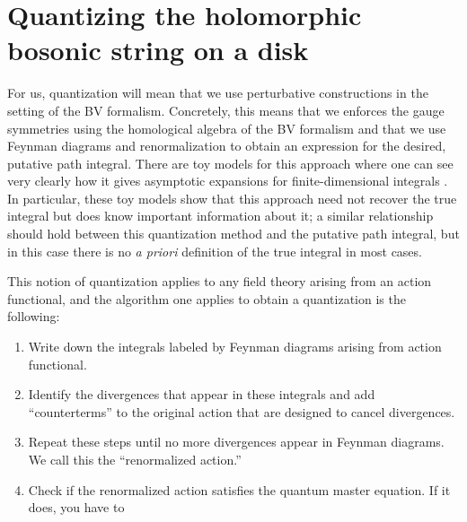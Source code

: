 \section{Quantizing the holomorphic bosonic string on a disk} 



For us, quantization will mean that we use perturbative constructions in the setting of the BV formalism.
Concretely, this means that we enforces the gauge symmetries using the homological algebra of the BV formalism 
and that we use Feynman diagrams and renormalization to obtain an expression for the desired, putative path integral. 
There are toy models for this approach where one can see very clearly how it gives asymptotic expansions for finite-dimensional integrals .
In particular, these toy models show that this approach need not recover the true integral
but does know important information about it;
a similar relationship should hold between this quantization method and the putative path integral, 
but in this case there is no {\em a priori} definition of the true integral in most cases.

This notion of quantization applies to any field theory arising from an action functional,
and the algorithm one applies to obtain a quantization is the following:
\begin{enumerate}
\item Write down the integrals labeled by Feynman diagrams arising from action functional.
\item Identify the divergences that appear in these integrals and add ``counterterms'' to the original action that are designed to cancel divergences.
\item Repeat these steps until no more divergences appear in Feynman diagrams.
We call this the ``renormalized action.''
\item Check if the renormalized action satisfies the quantum master equation. 
If it does, you have to 
\end{enumerate}

